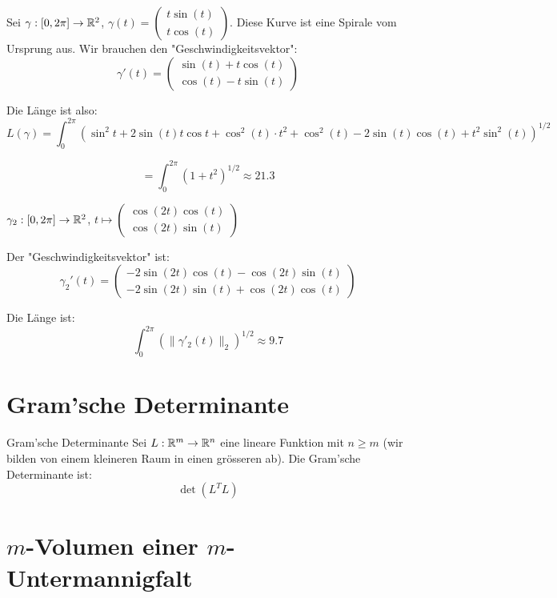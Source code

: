 \documentclass[12pt]{article}
\begin{document}
\begin{example}{}{}
    Sei $\gamma: [0, 2\pi] \rightarrow \mathbb{R}^2$, $\gamma(t) = \begin{pmatrix} t \sin(t) \\ t \cos(t) \end{pmatrix}$. Diese Kurve ist eine Spirale vom Ursprung aus. Wir brauchen den "Geschwindigkeitsvektor":
    $$
        \gamma'(t) = \begin{pmatrix} \sin(t) + t\cos(t) \\ \cos(t) - t \sin(t) \end{pmatrix}
    $$

    Die Länge ist also:
    $$
        L(\gamma) = \int_{0}^{2\pi} \left( \sin^2t + 2\sin(t) t \cos t  + \cos^2(t) \cdot t^2 + \cos^2(t) - 2\sin(t)\cos(t) + t^2\sin^2(t)\right)^{1/2}
    $$

    $$
        = \int_{0}^{2\pi} (1 + t^2)^{1/2} \approx 21.3
    $$
\end{example}

\begin{example}{}{}
    $\gamma_2: [0, 2\pi] \rightarrow \mathbb{R}^2$, $t \mapsto \begin{pmatrix} \cos(2t)\cos(t) \\ \cos(2t)\sin(t) \end{pmatrix}$

    Der "Geschwindigkeitsvektor" ist:
    $$
        \gamma_2'(t) = \begin{pmatrix} -2\sin(2t)\cos(t) - \cos(2t)\sin(t) \\ -2\sin(2t)\sin(t)+\cos(2t)\cos(t) \end{pmatrix}
    $$

    Die Länge ist:
    $$
        \int_{0}^{2\pi} \left( \lVert \gamma'_2(t) \rVert_2 \right)^{1/2} \approx 9.7
    $$
\end{example}

\section{Gram'sche Determinante}

\begin{definition}{Gram'sche Determinante}{}
    Sei $L: \mathbb{R}^m \rightarrow \mathbb{R}^n$ eine lineare Funktion mit $n \geq m$ (wir bilden von einem kleineren Raum in einen grösseren ab). Die Gram'sche Determinante ist:
    $$
        \det(L^T L)
    $$
\end{definition}

\section{$m$-Volumen einer $m$-Untermannigfalt}
\end{document}
